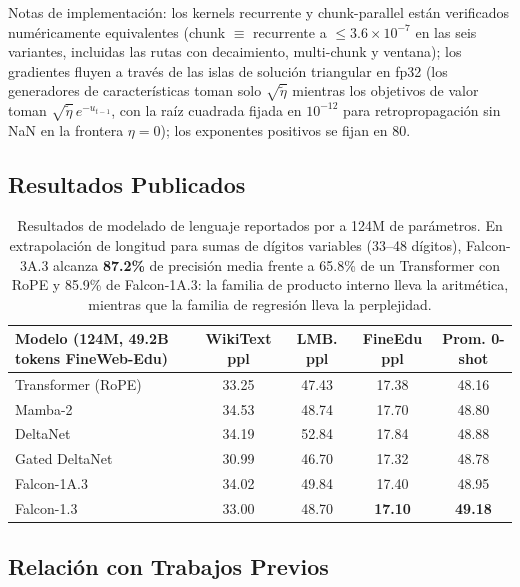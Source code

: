 Notas de implementación: los kernels recurrente y chunk-parallel están verificados numéricamente equivalentes (chunk $\equiv$ recurrente a $\le 3.6 \times 10^{-7}$ en las seis variantes, incluidas las rutas con decaimiento, multi-chunk y ventana); los gradientes fluyen a través de las islas de solución triangular en fp32 (los generadores de características toman solo $\sqrt{\tilde{\eta}}$ mientras los objetivos de valor toman $\sqrt{\tilde{\eta}}\, e^{-u_{t-1}}$, con la raíz cuadrada fijada en $10^{-12}$ para retropropagación sin NaN en la frontera $\eta = 0$); los exponentes positivos se fijan en $80$.

\subsection{Resultados Publicados}

\begin{table}[H]
\centering
\small
\begin{tabularx}{0.95\linewidth}{Xcccc}
\toprule
\textbf{Modelo (124M, 49.2B tokens FineWeb-Edu)} & \textbf{WikiText ppl} & \textbf{LMB. ppl} & \textbf{FineEdu ppl} & \textbf{Prom. 0-shot} \\
\midrule
Transformer (RoPE) & 33.25 & 47.43 & 17.38 & 48.16 \\
Mamba-2 & 34.53 & 48.74 & 17.70 & 48.80 \\
DeltaNet & 34.19 & 52.84 & 17.84 & 48.88 \\
Gated DeltaNet & 30.99 & 46.70 & 17.32 & 48.78 \\
Falcon-1A.3 & 34.02 & 49.84 & 17.40 & 48.95 \\
Falcon-1.3 & 33.00 & 48.70 & \textbf{17.10} & \textbf{49.18} \\
\bottomrule
\end{tabularx}
\caption{Resultados de modelado de lenguaje reportados por \citet{zhang_falcon_2026} a 124M de parámetros. En extrapolación de longitud para sumas de dígitos variables (33--48 dígitos), Falcon-3A.3 alcanza \textbf{87.2\%} de precisión media frente a 65.8\% de un Transformer con RoPE y 85.9\% de Falcon-1A.3: la familia de producto interno lleva la aritmética, mientras que la familia de regresión lleva la perplejidad.}
\label{tab:falcon-results}
\end{table}

\subsection{Relación con Trabajos Previos}

